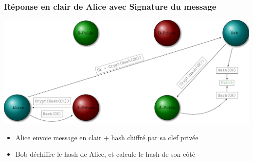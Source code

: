 
\begin{frame}
\frametitle{Réponse en clair de Alice avec Signature du message}
    \begin{center}
        \includegraphics[scale=0.55]{res-src/asym_crypto_sign}
    \end{center}
    \begin{itemize}
        \item Alice envoie message en clair + hash chiffré par sa clef privée
        \item Bob déchiffre le hash de Alice, et calcule le hash de son côté
    \end{itemize}
\end{frame}
